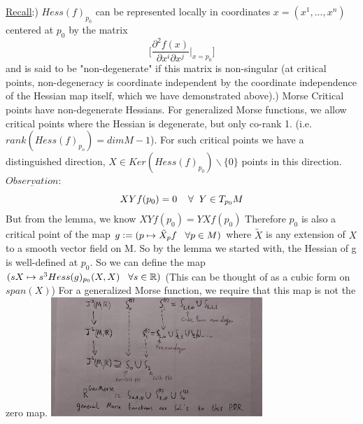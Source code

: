 \documentclass{article}
\newtheorem{proposed work}[theorem]{Proposed Work}
\theoremstyle{definition}
\begin{document}
\underline{Recall}:) $Hess(f)_{p_0}$ can be represented locally in coordinates $x=(x^1,...,x^n)$ centered at $p_0$ by the matrix $$\Big[\frac{\partial^2 f(x)}{\partial x^i \partial x^j}\Big|_{x=p_0}\Big]$$ and is said to be "non-degenerate" if this matrix is non-singular (at critical points, non-degeneracy is coordinate independent by the coordinate independence of the Hessian map itself, which we have demonstrated above).) Morse Critical points have non-degenerate Hessians.
\newline
\newline
For generalized Morse functions, we allow critical points where the Hessian is degenerate, but only co-rank 1. (i.e. $rank(Hess(f)_{p_o})=dimM-1$). For such critical points we have a distinguished direction, $X\in Ker(Hess(f)_{p_0})\backslash \{0\}$ points in this direction.
\newline
\newline
$\underline{Observation}:$ 
$$XYf(p_0)=0\hspace{4mm} \forall \hspace{2mm}Y\in T_{p_0}M$$
But from the lemma, we know $XYf(p_0)=YXf(p_0)$
Therefore $p_0$ is also a critical point of the map $g:=(p\mapsto \tilde{X}_pf \hspace{3mm}\forall p\in M)$ where $\tilde{X}$ is any extension of $X$ to a smooth vector field on M. So by the lemma we started with, the Hessian of g is well-defined at $p_0.$
So we can define the map \newline
$(sX\mapsto s^3Hess(g)_{p_0}(X,X)\hspace{3mm} \forall s\in \mathbb{R})$ \hspace{4mm}(This can be thought of as a cubic form on $span(X)$)
For a generalized Morse function, we require that this map is not the zero map.
\newline
\includegraphics[width=8cm]{GeneralMorse.jpg}
\end{document}
